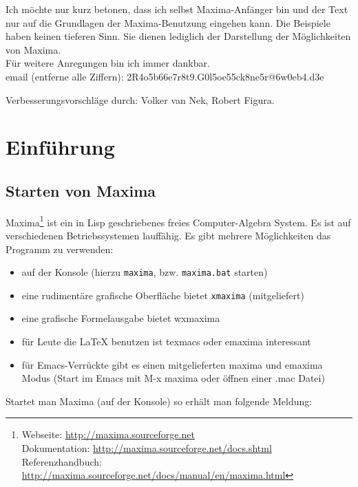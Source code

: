 \documentclass[ngerman,12pt]{scrartcl}
\begin{document}
\vspace{1cm}

Ich möchte nur kurz betonen, dass ich selbst Maxima-Anfänger bin und der Text nur auf die Grundlagen der Maxima-Benutzung eingehen kann. Die Beispiele haben keinen tieferen Sinn. Sie dienen lediglich der Darstellung der Möglichkeiten von Maxima.\\
Für weitere Anregungen bin ich immer dankbar\@.\\
email (entferne alle Ziffern): 2R4o5b66e7r8t9.G0l5oe55ck8ne5r@6w0eb4.d3e

\vspace{1cm}
Verbesserungsvorschläge durch: Volker van Nek, Robert Figura.

\newpage
\section{Einführung}

\subsection{Starten von Maxima}

Maxima\footnote
{Webseite: \url{http://maxima.sourceforge.net} \\
Dokumentation: \url{http://maxima.sourceforge.net/docs.shtml} \\
Referenzhandbuch: \url{http://maxima.sourceforge.net/docs/manual/en/maxima.html}}
ist ein in Lisp geschriebenes freies Computer-Algebra System. Es ist
auf verschiedenen Betriebssystemen lauffähig.
Es gibt mehrere Möglichkeiten das Programm zu verwenden:

\begin{itemize}
\item auf der Konsole (hierzu \texttt{maxima}, bzw. \texttt{maxima.bat} starten)
\item eine rudimentäre grafische Oberfläche bietet \texttt{xmaxima} (mitgeliefert)
\item eine grafische Formelausgabe bietet wxmaxima
\item für Leute die \LaTeX{} benutzen ist texmacs oder emaxima interessant
\item für Emacs-Verrückte gibt es einen mitgelieferten maxima und
  emaxima Modus (Start im Emacs mit M-x maxima oder öffnen einer {.mac} Datei)
\end{itemize}

Startet man Maxima (auf der Konsole) so erhält man folgende Meldung:
\end{document}
